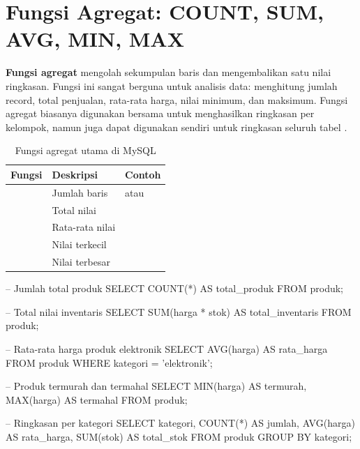 ﻿\section{Fungsi Agregat: COUNT, SUM, AVG, MIN, MAX}

\textbf{Fungsi agregat} mengolah sekumpulan baris dan mengembalikan satu nilai ringkasan. Fungsi ini sangat berguna untuk analisis data: menghitung jumlah record, total penjualan, rata-rata harga, nilai minimum, dan maksimum. Fungsi agregat biasanya digunakan bersama  untuk menghasilkan ringkasan per kelompok, namun juga dapat digunakan sendiri untuk ringkasan seluruh tabel \cite{mysqlDocs}.

\begin{table}[H]
\centering
\begin{tabular}{|P{2.5cm}|P{5cm}|P{5cm}|}
\hline
\textbf{Fungsi} & \textbf{Deskripsi} & \textbf{Contoh} \\
\hline
{} & Jumlah baris &  atau  \\
\hline
{} & Total nilai &  \\
\hline
{} & Rata-rata nilai &  \\
\hline
{} & Nilai terkecil &  \\
\hline
{} & Nilai terbesar &  \\
\hline
\end{tabular}
\caption{Fungsi agregat utama di MySQL}
\end{table}

\begin{webcode}[language=SQL, caption={Penggunaan fungsi agregat}]
-- Jumlah total produk
SELECT COUNT(*) AS total_produk FROM produk;

-- Total nilai inventaris
SELECT SUM(harga * stok) AS total_inventaris FROM produk;

-- Rata-rata harga produk elektronik
SELECT AVG(harga) AS rata_harga
  FROM produk WHERE kategori = 'elektronik';

-- Produk termurah dan termahal
SELECT MIN(harga) AS termurah, MAX(harga) AS termahal FROM produk;

-- Ringkasan per kategori
SELECT kategori,
       COUNT(*) AS jumlah,
       AVG(harga) AS rata_harga,
       SUM(stok) AS total_stok
FROM produk GROUP BY kategori;
\end{webcode}

